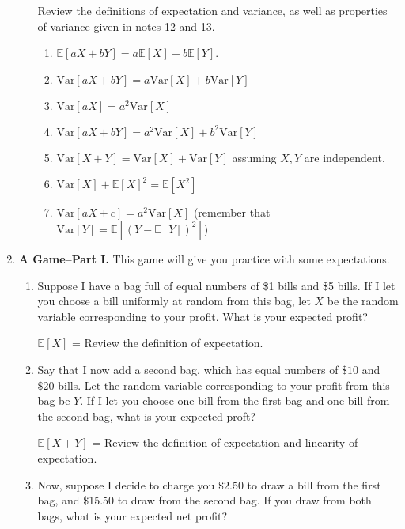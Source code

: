 \documentclass[11pt,preview]{standalone} %
\newcommand{\E}{\mathbb{E}}
\newcommand{\Var}{\text{Var}}
\begin{document}
\begin{enumerate}
\begin{enumerate}
\begin{Multi}
Review the definitions of expectation and variance, as well as properties of variance given in notes 12 and 13.
\begin{enumerate}
\TrueChoice\item $\E[aX + bY] = a\E[X]+ b\E[Y]$. 
\FalseChoice\item $\Var[aX + bY] = a\Var[X] + b\Var[Y]$
\TrueChoice\item $\Var[aX] = a^2\Var[X]$
\FalseChoice\item $\Var[aX + bY] = a^2\Var[X] + b^2\Var[Y]$
\TrueChoice\item $\Var[X + Y] = \Var[X] + \Var[Y]$ assuming $X,Y$ are independent.
\TrueChoice\item $\Var[X] + \E[X]^2 = \E[X^2]$
\TrueChoice\item $\Var[aX + c] = a^2\Var[X]$  (remember that $\Var[Y] = \E[(Y - \E[Y])^2]$)
\end{enumerate}
\end{Multi}
\end{enumerate}
\item {\bf A Game--Part I.} This game will give you practice with some expectations. 
\begin{enumerate}
\item Suppose I have a bag full of equal numbers of \$1 bills and \$5 bills. If I let you choose a bill uniformly at random from this bag, let $X$ be the random variable corresponding to your profit. What is your expected profit?
\begin{Freeform}{3}
$\E[X]$ = 
\Hint Review the definition of expectation.
\end{Freeform}
\item Say that I now add a second bag, which has equal numbers of $\$10$ and $\$20$ bills. Let the random variable corresponding to your profit from this bag be $Y$. If I let you choose one bill from the first bag and one bill from the second bag, what is your expected proft?
\begin{Freeform}{18}
$\E[X + Y]$ = 
\Hint Review the definition of expectation and linearity of expectation.
\end{Freeform}
\item Now, suppose I decide to charge you $\$2.50$ to draw a bill from the first bag, and \$15.50 to draw from the second bag. If you draw from both bags, what is your expected net profit?

\end{enumerate}
\end{enumerate}
\end{document}
